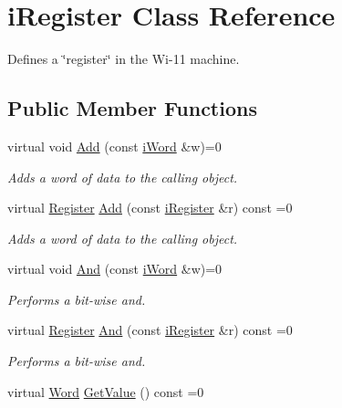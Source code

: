 \hypertarget{classiRegister}{
\section{iRegister Class Reference}
\label{classiRegister}
}


Defines a \char`\"{}register\char`\"{} in the Wi-\/11 machine.  


\subsection*{Public Member Functions}
\begin{DoxyCompactItemize}
\item 
virtual void \hyperlink{classiRegister_acb13aa880933f43088958723c9d6e564}{Add} (const \hyperlink{classiWord}{iWord} \&w)=0
\begin{DoxyCompactList}\small\item\em Adds a word of data to the calling object. \item\end{DoxyCompactList}\item 
virtual \hyperlink{classRegister}{Register} \hyperlink{classiRegister_abaaacfa8cb18bea90a78673bd572a1c8}{Add} (const \hyperlink{classiRegister}{iRegister} \&r) const =0
\begin{DoxyCompactList}\small\item\em Adds a word of data to the calling object. \item\end{DoxyCompactList}\item 
virtual void \hyperlink{classiRegister_ae8114106e70653a705f04ba3892ed9e1}{And} (const \hyperlink{classiWord}{iWord} \&w)=0
\begin{DoxyCompactList}\small\item\em Performs a bit-\/wise and. \item\end{DoxyCompactList}\item 
virtual \hyperlink{classRegister}{Register} \hyperlink{classiRegister_aa9a15ebfeea1e5857a1098b73cc583ad}{And} (const \hyperlink{classiRegister}{iRegister} \&r) const =0
\begin{DoxyCompactList}\small\item\em Performs a bit-\/wise and. \item\end{DoxyCompactList}\item 
virtual \hyperlink{classWord}{Word} \hyperlink{classiRegister_ae7266f6f981b621f53f3c7cf77d4966a}{GetValue} () const =0

\end{DoxyCompactItemize}
